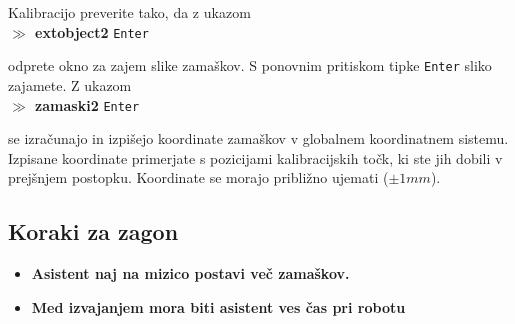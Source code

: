 Kalibracijo preverite tako, da z ukazom \\

\vspace{-0.3cm}%
\textbf{$\gg$ extobject2} \verb"Enter"\\ %
\vspace{-0.1cm}%

odprete okno za zajem slike zamaškov. S ponovnim pritiskom tipke \verb"Enter" sliko zajamete. Z ukazom  \\

\vspace{-0.3cm}%
\textbf{$\gg$ zamaski2} \verb"Enter" \\%
\vspace{-0.1cm}%

se izračunajo in izpišejo koordinate zamaškov v globalnem koordinatnem sistemu. Izpisane koordinate primerjate s pozicijami kalibracijskih točk, ki ste jih dobili v prejšnjem postopku. Koordinate se morajo približno ujemati (\texttildelow$\pm1mm$).

\vspace{-0.2cm}
\subsection{Koraki za zagon}
\vspace{0.3cm} %

\begin{mdframed}[backgroundcolor=red!20, shadow=true,roundcorner=8pt]
\begin{itemize}
  \item \textbf{Asistent naj na mizico postavi več zamaškov.}
  \item \textbf{Med izvajanjem mora biti asistent ves čas pri robotu}
\end{itemize}
\end{mdframed}

